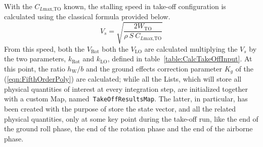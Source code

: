 %
With the $C_{L\text{max,TO}}$ known, the stalling speed in take-off configuration is calculated using the classical formula provided below.
%
\begin{equation}
V_s=\sqrt{\dfrac{2W_{\text{TO}}}{\rho\ S\ C_{L\text{max,TO}}}}
\label{eqn:Lift.Equation}
\end{equation} 
%
From this speed, both the $V_{\text{Rot}}$ both the $V_{\text{LO}}$ are calculated multiplying the $V_s$ by the two parameters, $k_{\text{Rot}}$ and $k_{\text{LO}}$, defined in table~\ref{table:CalcTakeOffInput}.
%
At this point, the ratio $h_{\text{W}}/b$ and the ground effects correction parameter $K_g$ of the (\ref{eqn:FifthOrderPoly}) are calculated; while all the \gls{List}s, which will store all physical quantities of interest at every integration step, are initialized together with a custom \gls{Map}, named~\lstinline[language=Java]!TakeOffResultsMap!. The latter, in particular, has been created with the purpose of store the state vector, and all the related physical quantities, only at some key point during the take-off run, like the end of the ground roll phase, the end of the rotation phase and the end of the airborne phase.
%
